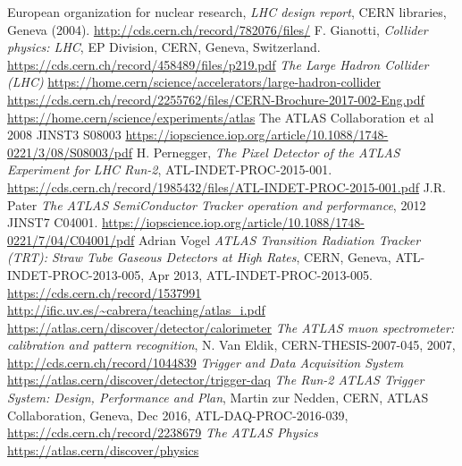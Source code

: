 \documentclass[a4paper, oneside]{book}
\begin{document}
			
	\begin{thebibliography}{17}
			
			
			 European organization for nuclear research, \textit{LHC design report}, CERN libraries, Geneva (2004). \url{http://cds.cern.ch/record/782076/files/}
			 F. Gianotti, \textit{Collider physics: LHC}, EP Division, CERN, Geneva, Switzerland. \url{https://cds.cern.ch/record/458489/files/p219.pdf}
			\textit{The Large Hadron Collider (LHC)}
			\url{https://home.cern/science/accelerators/large-hadron-collider}
			 \url{https://cds.cern.ch/record/2255762/files/CERN-Brochure-2017-002-Eng.pdf}
			 \url{https://home.cern/science/experiments/atlas}
			  The ATLAS Collaboration et al 2008 JINST3 S08003
			\url{https://iopscience.iop.org/article/10.1088/1748-0221/3/08/S08003/pdf}
			 H. Pernegger, \textit{The Pixel Detector of the ATLAS Experiment for LHC Run-2}, ATL-INDET-PROC-2015-001. \url{https://cds.cern.ch/record/1985432/files/ATL-INDET-PROC-2015-001.pdf}
			 J.R. Pater \textit{The ATLAS SemiConductor Tracker operation and performance}, 2012 JINST7 C04001. \url{https://iopscience.iop.org/article/10.1088/1748-0221/7/04/C04001/pdf}
			 Adrian Vogel \textit{ATLAS Transition Radiation Tracker (TRT): Straw Tube Gaseous Detectors at High Rates}, CERN,
			Geneva, ATL-INDET-PROC-2013-005, Apr 2013, ATL-INDET-PROC-2013-005. \url{https://cds.cern.ch/record/1537991}
			\url{http://ific.uv.es/~cabrera/teaching/atlas_i.pdf}\\
			\url{https://atlas.cern/discover/detector/calorimeter}
			\textit{The ATLAS muon spectrometer: calibration and pattern recognition}, N. Van Eldik, CERN-THESIS-2007-045, 2007,
			\url{http://cds.cern.ch/record/1044839}
			\textit{Trigger and Data Acquisition System}
			\url{https://atlas.cern/discover/detector/trigger-daq}	
			\textit{The Run-2 ATLAS Trigger System: Design, Performance and
			Plan}, Martin zur Nedden, CERN, ATLAS Collaboration, Geneva, Dec 2016, ATL-DAQ-PROC-2016-039,
			\url{https://cds.cern.ch/record/2238679}
			\textit{The ATLAS Physics}
			\url{https://atlas.cern/discover/physics}
			

\end{thebibliography}
\end{document}

